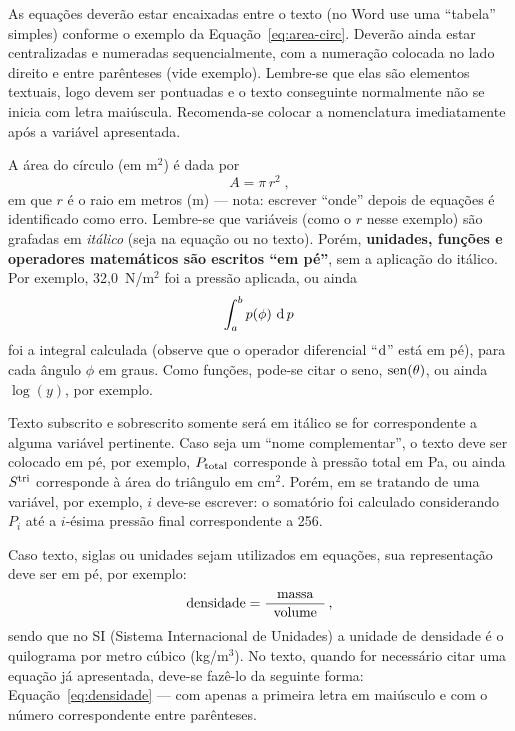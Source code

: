 \documentclass[12pt, a4paper, twoside, onecolumn]{article}
\begin{document}
As equações deverão estar encaixadas entre o texto (no Word use uma ``tabela'' simples) conforme o exemplo da Equação~\eqref{eq:area-circ}. Deverão ainda estar centralizadas e numeradas sequencialmente, com a numeração colocada no lado direito e entre parênteses (vide exemplo). Lembre-se que elas são elementos textuais, logo devem ser pontuadas e o texto conseguinte normalmente não se inicia com letra maiúscula. Recomenda-se colocar a nomenclatura imediatamente após a variável apresentada.

A área do círculo (em m$^2$) é dada por 
\begin{equation}
	A = \pi \, r^2\;,
\label{eq:area-circ}
\end{equation}
%
em que $r$ é o raio em metros (m) --- nota: escrever ``onde'' depois de equações é identificado como erro. Lembre-se que variáveis (como o $r$ nesse exemplo) são grafadas em \textit{itálico} (seja na equação ou no texto). Porém, \textbf{unidades, funções e operadores matemáticos são escritos ``em pé''}, sem a aplicação do itálico. Por exemplo, 32,0~N/m$^2$ foi a pressão aplicada, ou ainda
%
\begin{equation}
	\int_a^b p(\phi)\, \operatorname{d} p\,
\label{eq:int}
\end{equation}
%
foi a integral calculada (observe que o operador diferencial ``$\text{d}$'' está em pé), para cada ângulo $\phi$ em graus. Como funções, pode-se citar o seno, $\operatorname{sen}(\theta)$, ou ainda $\log(y)$, por exemplo. 
%

Texto subscrito e sobrescrito somente será em itálico se for correspondente a alguma variável pertinente. Caso seja um ``nome complementar'', o texto deve ser colocado em pé, por exemplo, $P_{\text{total}}$ corresponde à pressão total em Pa, ou ainda $S^{\text{tri}}$ corresponde à área do triângulo em cm$^2$. Porém, em se tratando de uma variável, por exemplo, $i$ deve-se escrever: o somatório foi calculado considerando $P_i$ até a $i$-ésima pressão final correspondente a 256.

Caso texto, siglas ou unidades sejam utilizados em equações, sua representação deve ser em pé, por exemplo:
%
\begin{equation}
	\text{densidade} = \frac{\text{massa}}{\;\;\text{volume}\;\;}\,,
\label{eq:densidade}
\end{equation}
%
sendo que no SI (Sistema Internacional de Unidades) a unidade de densidade é o quilograma por metro cúbico (kg/m$^3$).
%
No texto, quando for necessário citar uma equação já apresentada, deve-se fazê-lo da seguinte forma: Equação~\eqref{eq:densidade} --- com apenas a primeira letra em maiúsculo e com o número correspondente entre parênteses.
\end{document}
